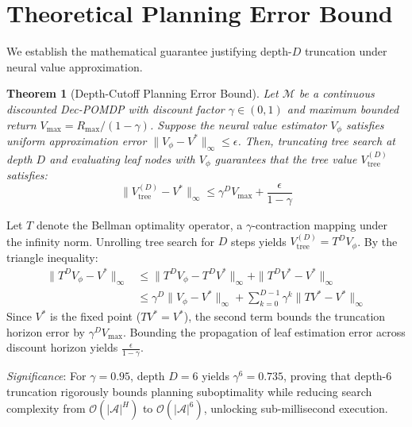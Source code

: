 \documentclass[conference]{IEEEtran}
\newtheorem{theorem}{Theorem}
\begin{document}
\section{Theoretical Planning Error Bound}
We establish the mathematical guarantee justifying depth-$D$ truncation under neural value approximation.

\begin{theorem}[Depth-Cutoff Planning Error Bound]
Let $\mathcal{M}$ be a continuous discounted Dec-POMDP with discount factor $\gamma \in (0, 1)$ and maximum bounded return $V_{\max} = R_{\max} / (1 - \gamma)$. Suppose the neural value estimator $V_\phi$ satisfies uniform approximation error $\|V_\phi - V^*\|_\infty \le \epsilon$. Then, truncating tree search at depth $D$ and evaluating leaf nodes with $V_\phi$ guarantees that the tree value $V_{\text{tree}}^{(D)}$ satisfies:
\begin{equation}
    \|V_{\text{tree}}^{(D)} - V^*\|_\infty \le \gamma^D V_{\max} + \frac{\epsilon}{1 - \gamma}
\end{equation}
\end{theorem}

\begin{IEEEproof}
Let $T$ denote the Bellman optimality operator, a $\gamma$-contraction mapping under the infinity norm. Unrolling tree search for $D$ steps yields $V_{\text{tree}}^{(D)} = T^D V_\phi$. By the triangle inequality:
\begin{align}
    \|T^D V_\phi - V^*\|_\infty &\le \|T^D V_\phi - T^D V^*\|_\infty + \|T^D V^* - V^*\|_\infty \nonumber \\
    &\le \gamma^D \|V_\phi - V^*\|_\infty + \sum_{k=0}^{D-1} \gamma^k \|T V^* - V^*\|_\infty
\end{align}
Since $V^*$ is the fixed point ($T V^* = V^*$), the second term bounds the truncation horizon error by $\gamma^D V_{\max}$. Bounding the propagation of leaf estimation error across discount horizon yields $\frac{\epsilon}{1 - \gamma}$.
\end{IEEEproof}

\textit{Significance}: For $\gamma = 0.95$, depth $D = 6$ yields $\gamma^6 = 0.735$, proving that depth-6 truncation rigorously bounds planning suboptimality while reducing search complexity from $\mathcal{O}(|\mathcal{A}|^H)$ to $\mathcal{O}(|\mathcal{A}|^6)$, unlocking sub-millisecond execution.
\end{document}
